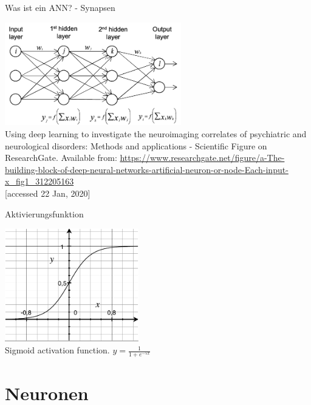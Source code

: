 \documentclass[handout]{beamer}
\begin{document}
    \begin{frame} {Was ist ein ANN? - Synapsen}
        \begin{center}
            \includegraphics[width=290px]{resources/ann-neuron2.png} \\
            \tiny Using deep learning to investigate the neuroimaging correlates of psychiatric and neurological disorders: Methods and applications - Scientific Figure on ResearchGate.
            \tiny Available from: \href{https://www.researchgate.net/figure/a-The-building-block-of-deep-neural-networks-artificial-neuron-or-node-Each-input-x\_fig1\_312205163}{https://www.researchgate.net/figure/a-The-building-block-of-deep-neural-networks-artificial-neuron-or-node-Each-input-x\_fig1\_312205163} \\
            \tiny [accessed 22 Jan, 2020]
        \end{center}
    \end{frame}


    \begin{frame} {Aktivierungsfunktion}
        \begin{center}
            \includegraphics[width=220px]{../resources/sigmoid.pdf} \\
            \tiny Sigmoid activation function. $y = \frac{1}{1+e^{-5x}}$
        \end{center}
    \end{frame}

    \section{Neuronen}
\end{document}
